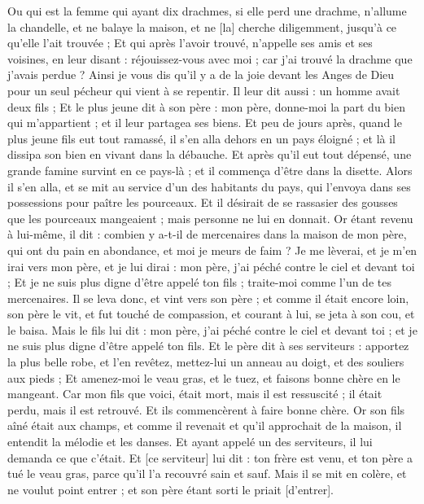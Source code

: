 \begin{multicols}{2}
Ou qui est la femme qui ayant dix drachmes, si elle perd une drachme, n'allume la chandelle, et ne balaye la maison, et ne [la] cherche diligemment, jusqu'à ce qu'elle l'ait trouvée ;
Et qui après l'avoir trouvé, n'appelle ses amis et ses voisines, en leur disant : réjouissez-vous avec moi ; car j'ai trouvé la drachme que j'avais perdue ?
Ainsi je vous dis qu'il y a de la joie devant les Anges de Dieu pour un seul pécheur qui vient à se repentir.
Il leur dit aussi : un homme avait deux fils ;
Et le plus jeune dit à son père : mon père, donne-moi la part du bien qui m'appartient ; et il leur partagea ses biens.
Et peu de jours après, quand le plus jeune fils eut tout ramassé, il s'en alla dehors en un pays éloigné ; et là il dissipa son bien en vivant dans la débauche.
Et après qu'il eut tout dépensé, une grande famine survint en ce pays-là ; et il commença d'être dans la disette.
Alors il s'en alla, et se mit au service d'un des habitants du pays, qui l'envoya dans ses possessions pour paître les pourceaux.
Et il désirait de se rassasier des gousses que les pourceaux mangeaient ; mais personne ne lui en donnait.
Or étant revenu à lui-même, il dit : combien y a-t-il de mercenaires dans la maison de mon père, qui ont du pain en abondance, et moi je meurs de faim ?
Je me lèverai, et je m'en irai vers mon père, et je lui dirai : mon père, j'ai péché contre le ciel et devant toi ;
Et je ne suis plus digne d'être appelé ton fils ; traite-moi comme l'un de tes mercenaires.
Il se leva donc, et vint vers son père ; et comme il était encore loin, son père le vit, et fut touché de compassion, et courant à lui, se jeta à son cou, et le baisa.
Mais le fils lui dit : mon père, j'ai péché contre le ciel et devant toi ; et je ne suis plus digne d'être appelé ton fils.
Et le père dit à ses serviteurs : apportez la plus belle robe, et l'en revêtez, mettez-lui un anneau au doigt, et des souliers aux pieds ;
Et amenez-moi le veau gras, et le tuez, et faisons bonne chère en le mangeant.
Car mon fils que voici, était mort, mais il est ressuscité ; il était perdu, mais il est retrouvé. Et ils commencèrent à faire bonne chère.
Or son fils aîné était aux champs, et comme il revenait et qu'il approchait de la maison, il entendit la mélodie et les danses.
Et ayant appelé un des serviteurs, il lui demanda ce que c'était.
Et [ce serviteur] lui dit : ton frère est venu, et ton père a tué le veau gras, parce qu'il l'a recouvré sain et sauf.
Mais il se mit en colère, et ne voulut point entrer ; et son père étant sorti le priait [d'entrer].

\end{multicols}
